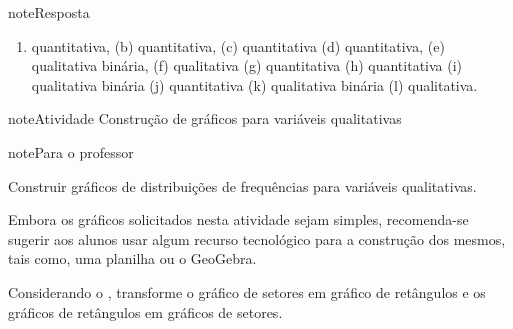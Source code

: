 \begin{sphinxadmonition}{note}{Resposta}
\begin{enumerate}
\item {} 
quantitativa, (b) quantitativa, (c) quantitativa (d) quantitativa, (e) qualitativa binária, (f) qualitativa (g) quantitativa (h) quantitativa (i) qualitativa binária (j) quantitativa (k) qualitativa binária (l) qualitativa.

\end{enumerate}
\end{sphinxadmonition}
\label{\detokenize{PE103-2:ativ-3-construcao-de-grafico-variavel-qualitativa}}
\begin{sphinxadmonition}{note}{Atividade}{ Construção de gráficos para variáveis qualitativas}

\begin{sphinxadmonition}{note}{Para o professor}

 Construir gráficos de distribuições de frequências para variáveis qualitativas.

 Embora os gráficos solicitados nesta atividade sejam simples, recomenda-se sugerir aos alunos usar algum recurso tecnológico para a construção dos mesmos, tais como, uma planilha ou o GeoGebra.
\end{sphinxadmonition}

Considerando o {\hyperref[\detokenize{PE103-0:fig-infografico-pnad-4}]{}}, transforme o gráfico de setores em gráfico de retângulos e os gráficos de retângulos em gráficos de setores.
\end{sphinxadmonition}

